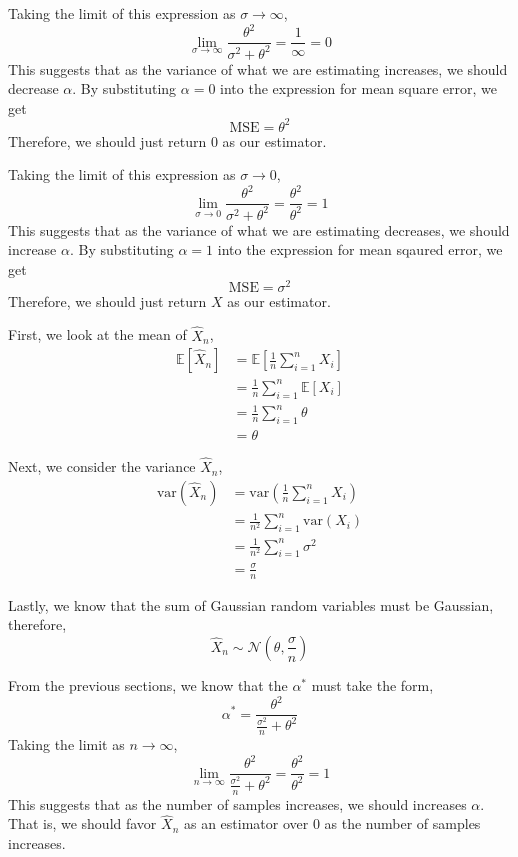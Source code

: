 \documentclass[12pt,twoside]{article}
\begin{document}
\begin{problems}
\begin{problemparts}
\problempart %

Taking the limit of this expression as $\sigma \rightarrow \infty$,
$$ \lim_{\sigma \rightarrow \infty} \frac{\theta^2}{\sigma^2 + \theta^2} = 
    \frac{1}{\infty} = 0 $$
This suggests that as the variance of what we are estimating increases, we 
should decrease $\alpha$. By substituting $\alpha = 0$ into the expression for
mean square error, we get
$$ \mathrm{MSE} = \theta^2 $$
Therefore, we should just return $0$ as our estimator.

\problempart %

Taking the limit of this expression as $\sigma \rightarrow 0$,
$$ \lim_{\sigma \rightarrow 0} \frac{\theta^2}{\sigma^2 + \theta^2} = 
    \frac{\theta^2}{\theta^2} = 1 $$
This suggests that as the variance of what we are estimating decreases, we 
should increase $\alpha$. By substituting $\alpha = 1$ into the expression for
mean sqaured error, we get
$$ \mathrm{MSE} = \sigma^2 $$
Therefore, we should just return $X$ as our estimator.

\problempart %

First, we look at the mean of $\hat{X}_n$,
\begin{align*}
    \mathbb{E}\left[\hat{X}_n\right] &= \mathbb{E}\left[\frac{1}{n} 
        \sum_{i = 1}^n X_i \right] \\
    &= \frac{1}{n} \sum_{i = 1}^n \mathbb{E}[X_i] \\
    &= \frac{1}{n} \sum_{i = 1}^n \theta \\
    &= \theta
\end{align*}

Next, we consider the variance $\hat{X}_n$,
\begin{align*}
    \mathrm{var}(\hat{X}_n) &= \mathrm{var}(\frac{1}{n} \sum_{i = 1}^n X_i) \\
    &= \frac{1}{n^2} \sum_{i = 1}^n \mathrm{var}(X_i) \\
    &= \frac{1}{n^2} \sum_{i = 1}^n \sigma^2 \\
    &= \frac{\sigma}{n}
\end{align*}

Lastly, we know that the sum of Gaussian random variables must be Gaussian,
therefore,
$$ \hat{X}_n \sim  \mathcal{N}\left(\theta, \frac{\sigma}{n}\right) $$

From the previous sections, we know that the $\alpha^*$ must take the form,
$$ \alpha^* = \frac{\theta^2}{\frac{\sigma^2}{n} + \theta^2} $$
Taking the limit as $n \rightarrow \infty$,
$$ \lim_{n \rightarrow \infty} \frac{\theta^2}{\frac{\sigma^2}{n} + \theta^2}
    = \frac{\theta^2}{\theta^2} = 1 $$
This suggests that as the number of samples increases, we should increases
$\alpha$. That is, we should favor $\hat{X}_n$ as an estimator over $0$ as the
number of samples increases.


\end{problemparts}
\end{problems}
\end{document}
